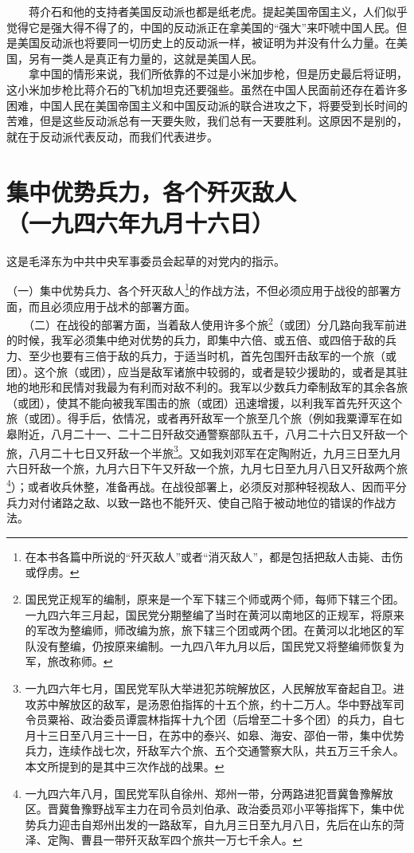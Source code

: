 \documentclass[cn,11pt,chinese]{elegantbook}
\def\myformat#1{\hfil\hfil #1}
\begin{document}
　　蒋介石和他的支持者美国反动派也都是纸老虎。提起美国帝国主义，人们似乎觉得它是强大得不得了的，中国的反动派正在拿美国的“强大”来吓唬中国人民。但是美国反动派也将要同一切历史上的反动派一样，被证明为并没有什么力量。在美国，另有一类人是真正有力量的，这就是美国人民。\\
　　拿中国的情形来说，我们所依靠的不过是小米加步枪，但是历史最后将证明，这小米加步枪比蒋介石的飞机加坦克还要强些。虽然在中国人民面前还存在着许多困难，中国人民在美国帝国主义和中国反动派的联合进攻之下，将要受到长时间的苦难，但是这些反动派总有一天要失败，我们总有一天要胜利。这原因不是别的，就在于反动派代表反动，而我们代表进步。
\newpage\section*{\myformat{集中优势兵力，各个歼灭敌人}\\\myformat{（一九四六年九月十六日）}}
\begin{introduction}\item  这是毛泽东为中共中央军事委员会起草的对党内的指示。\end{introduction}
（一）集中优势兵力、各个歼灭敌人\footnote[1]{ 在本书各篇中所说的“歼灭敌人”或者“消灭敌人”，都是包括把敌人击毙、击伤或俘虏。}的作战方法，不但必须应用于战役的部署方面，而且必须应用于战术的部署方面。\\
　　（二）在战役的部署方面，当着敌人使用许多个旅\footnote[2]{ 国民党正规军的编制，原来是一个军下辖三个师或两个师，每师下辖三个团。一九四六年三月起，国民党分期整编了当时在黄河以南地区的正规军，将原来的军改为整编师，师改编为旅，旅下辖三个团或两个团。在黄河以北地区的军队没有整编，仍按原来编制。一九四八年九月以后，国民党又将整编师恢复为军，旅改称师。}（或团）分几路向我军前进的时候，我军必须集中绝对优势的兵力，即集中六倍、或五倍、或四倍于敌的兵力、至少也要有三倍于敌的兵力，于适当时机，首先包围歼击敌军的一个旅（或团）。这个旅（或团），应当是敌军诸旅中较弱的，或者是较少援助的，或者是其驻地的地形和民情对我最为有利而对敌不利的。我军以少数兵力牵制敌军的其余各旅（或团），使其不能向被我军围击的旅（或团）迅速增援，以利我军首先歼灭这个旅（或团）。得手后，依情况，或者再歼敌军一个旅至几个旅（例如我粟谭军在如皋附近，八月二十一、二十二日歼敌交通警察部队五千，八月二十六日又歼敌一个旅，八月二十七日又歼敌一个半旅\footnote[3]{ 一九四六年七月，国民党军队大举进犯苏皖解放区，人民解放军奋起自卫。进攻苏中解放区的敌军，是汤恩伯指挥的十五个旅，约十二万人。华中野战军司令员粟裕、政治委员谭震林指挥十九个团（后增至二十多个团）的兵力，自七月十三日至八月三十一日，在苏中的泰兴、如皋、海安、邵伯一带，集中优势兵力，连续作战七次，歼敌军六个旅、五个交通警察大队，共五万三千余人。本文所提到的是其中三次作战的战果。}。又如我刘邓军在定陶附近，九月三日至九月六日歼敌一个旅，九月六日下午又歼敌一个旅，九月七日至九月八日又歼敌两个旅\footnote[4]{ 一九四六年八月，国民党军队自徐州、郑州一带，分两路进犯晋冀鲁豫解放区。晋冀鲁豫野战军主力在司令员刘伯承、政治委员邓小平等指挥下，集中优势兵力迎击自郑州出发的一路敌军，自九月三日至九月八日，先后在山东的菏泽、定陶、曹县一带歼灭敌军四个旅共一万七千余人。}）；或者收兵休整，准备再战。在战役部署上，必须反对那种轻视敌人、因而平分兵力对付诸路之敌、以致一路也不能歼灭、使自己陷于被动地位的错误的作战方法。\\
\end{document}
